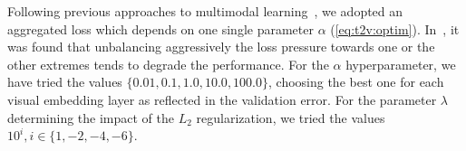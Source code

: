 Following previous approaches to multimodal learning~\cite{feng2014cross,ngiam2011multimodal}, we adopted an aggregated loss which depends on one single parameter $\alpha$ (\ref{eq:t2v:optim}).
In~\cite{feng2014cross}, it was found that unbalancing aggressively the loss pressure towards one or the other extremes tends to degrade the performance.
For the $\alpha$ hyperparameter, we have tried the values $\{0.01, 0.1, 1.0, 10.0, 100.0\}$, choosing the best one for each visual embedding layer as reflected in the validation error.
For the parameter $\lambda$ determining the impact of the $L_2$ regularization, we tried the values $10^i, i\in\{1,-2,-4,-6\}$.


